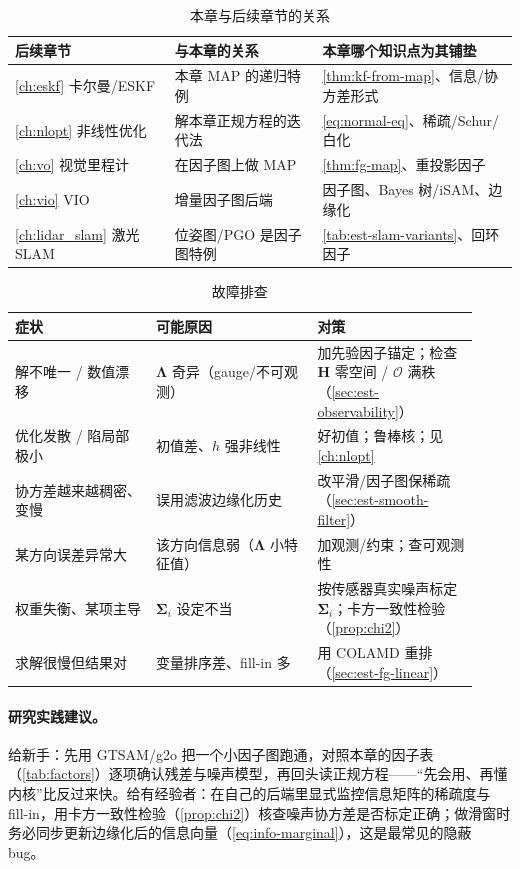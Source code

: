 \begin{table}[H]\centering\small
\caption{本章与后续章节的关系}
\begin{tabular}{lll}
\toprule
后续章节 & 与本章的关系 & 本章哪个知识点为其铺垫 \\
\midrule
\cref{ch:eskf} 卡尔曼/ESKF & 本章 MAP 的递归特例 & \cref{thm:kf-from-map}、信息/协方差形式 \\
\cref{ch:nlopt} 非线性优化 & 解本章正规方程的迭代法 & \cref{eq:normal-eq}、稀疏/Schur/白化 \\
\cref{ch:vo} 视觉里程计 & 在因子图上做 MAP & \cref{thm:fg-map}、重投影因子 \\
\cref{ch:vio} VIO & 增量因子图后端 & 因子图、Bayes 树/iSAM、边缘化 \\
\cref{ch:lidar_slam} 激光 SLAM & 位姿图/PGO 是因子图特例 & \cref{tab:est-slam-variants}、回环因子 \\
\bottomrule
\end{tabular}
\end{table}

\begin{table}[H]\centering\small
\caption{故障排查}
\begin{tabular}{p{0.28\linewidth}p{0.32\linewidth}p{0.32\linewidth}}
\toprule
症状 & 可能原因 & 对策 \\
\midrule
解不唯一 / 数值漂移 & $\boldsymbol{\Lambda}$ 奇异（gauge/不可观测） & 加先验因子锚定；检查 $\mathbf{H}$ 零空间 / $\mathcal{O}$ 满秩（\cref{sec:est-observability}） \\
优化发散 / 陷局部极小 & 初值差、$h$ 强非线性 & 好初值；鲁棒核；见 \cref{ch:nlopt} \\
协方差越来越稠密、变慢 & 误用滤波边缘化历史 & 改平滑/因子图保稀疏（\cref{sec:est-smooth-filter}） \\
某方向误差异常大 & 该方向信息弱（$\boldsymbol{\Lambda}$ 小特征值） & 加观测/约束；查可观测性 \\
权重失衡、某项主导 & $\boldsymbol{\Sigma}_i$ 设定不当 & 按传感器真实噪声标定 $\boldsymbol{\Sigma}_i$；卡方一致性检验（\cref{prop:chi2}） \\
求解很慢但结果对 & 变量排序差、fill-in 多 & 用 COLAMD 重排（\cref{sec:est-fg-linear}） \\
\bottomrule
\end{tabular}
\end{table}

\paragraph{研究实践建议。}
给新手：先用 GTSAM/g2o 把一个小因子图跑通，对照本章的因子表（\cref{tab:factors}）逐项确认残差与噪声模型，再回头读正规方程——“先会用、再懂内核”比反过来快。给有经验者：在自己的后端里显式监控信息矩阵的稀疏度与 fill-in，用卡方一致性检验（\cref{prop:chi2}）核查噪声协方差是否标定正确；做滑窗时务必同步更新边缘化后的信息向量（\cref{eq:info-marginal}），这是最常见的隐蔽 bug。

